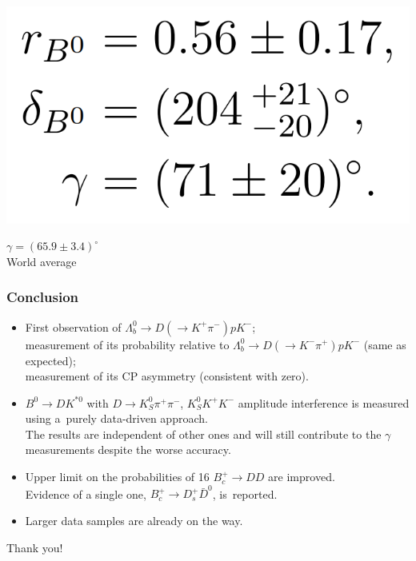 \documentclass[10pt, aspectratio=169]{beamer}
\def\Lb{{\Lambda_b^0}}
\def\pip{{\pi^+}}
\def\pim{{\pi^-}}
\def\Kp{{K^+}}
\def\Km{{K^-}}
\def\Kshort{{K_S^0}}
\def\Kstarz{{K^{*0}}{}}
\def\Bz{{B^0}}
\begin{document}
\begin{frame}[label=B2DKstar-results]
{  }
  \hspace{4ex}
  \parbox{.2\linewidth}{
    \includegraphics[width=\linewidth]{figures/lect/B2DKstar-results-phys-txt}
  }
  \hspace{4ex}
  \parbox{.2\linewidth}{\centering $\gamma = (65.9\pm3.4)^{\circ}$
  \\ World average}
\end{frame}%

\begin{frame}[label=conclusion]%
  \frametitle{Conclusion}
  \begin{itemize}
    \item First observation of $\Lb \to D\left(\to\Kp\pim\right) p\Km$;
      \\ measurement of its probability relative to
      $\Lb \to D\left(\to\Km\pip\right) p\Km$ (same as expected);
      \\ measurement of its CP asymmetry (consistent with zero).
    \item $\Bz\to D\Kstarz$ with $D\to\Kshort\pip\pim$, $\Kshort\Kp\Km$
      amplitude interference is measured using a~purely data-driven 
      approach.
      \\ The results are independent of other ones and will still 
      contribute to the $\gamma$ measurements despite the worse 
      accuracy.
    \item Upper limit on the probabilities of 16 $B_c^+\to DD$ are 
      improved.
      \\ Evidence of a single one, $B_c^+\to D_s^+\bar{D}^0$, 
      is~reported.
    \item Larger data samples are already on the way.
  \end{itemize}

  \pause \vfill \centering \large Thank you!
\end{frame}%
\end{document}
